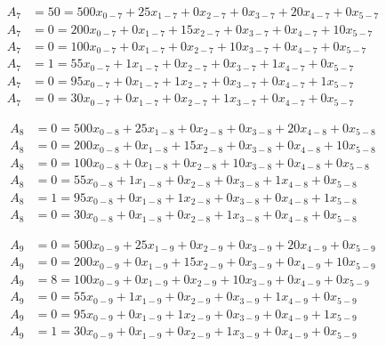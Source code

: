 \vspace{-\baselineskip}\begin{align*}
	A_{7} &= 50 = 500x_{0-7} + 25x_{1-7} + 0x_{2-7} + 0x_{3-7} + 20x_{4-7} + 0x_{5-7} \\ 
	A_{7} &= 0 = 200x_{0-7} + 0x_{1-7} + 15x_{2-7} + 0x_{3-7} + 0x_{4-7} + 10x_{5-7} \\ 
	A_{7} &= 0 = 100x_{0-7} + 0x_{1-7} + 0x_{2-7} + 10x_{3-7} + 0x_{4-7} + 0x_{5-7} \\ 
	A_{7} &= 1 = 55x_{0-7} + 1x_{1-7} + 0x_{2-7} + 0x_{3-7} + 1x_{4-7} + 0x_{5-7} \\ 
	A_{7} &= 0 = 95x_{0-7} + 0x_{1-7} + 1x_{2-7} + 0x_{3-7} + 0x_{4-7} + 1x_{5-7} \\ 
	A_{7} &= 0 = 30x_{0-7} + 0x_{1-7} + 0x_{2-7} + 1x_{3-7} + 0x_{4-7} + 0x_{5-7}
\end{align*}

\vspace{-\baselineskip}\begin{align*}
	A_{8} &= 0 = 500x_{0-8} + 25x_{1-8} + 0x_{2-8} + 0x_{3-8} + 20x_{4-8} + 0x_{5-8} \\ 
	A_{8} &= 0 = 200x_{0-8} + 0x_{1-8} + 15x_{2-8} + 0x_{3-8} + 0x_{4-8} + 10x_{5-8} \\ 
	A_{8} &= 0 = 100x_{0-8} + 0x_{1-8} + 0x_{2-8} + 10x_{3-8} + 0x_{4-8} + 0x_{5-8} \\ 
	A_{8} &= 0 = 55x_{0-8} + 1x_{1-8} + 0x_{2-8} + 0x_{3-8} + 1x_{4-8} + 0x_{5-8} \\ 
	A_{8} &= 1 = 95x_{0-8} + 0x_{1-8} + 1x_{2-8} + 0x_{3-8} + 0x_{4-8} + 1x_{5-8} \\ 
	A_{8} &= 0 = 30x_{0-8} + 0x_{1-8} + 0x_{2-8} + 1x_{3-8} + 0x_{4-8} + 0x_{5-8}
\end{align*}

\vspace{-\baselineskip}\begin{align*}
	A_{9} &= 0 = 500x_{0-9} + 25x_{1-9} + 0x_{2-9} + 0x_{3-9} + 20x_{4-9} + 0x_{5-9} \\ 
	A_{9} &= 0 = 200x_{0-9} + 0x_{1-9} + 15x_{2-9} + 0x_{3-9} + 0x_{4-9} + 10x_{5-9} \\ 
	A_{9} &= 8 = 100x_{0-9} + 0x_{1-9} + 0x_{2-9} + 10x_{3-9} + 0x_{4-9} + 0x_{5-9} \\ 
	A_{9} &= 0 = 55x_{0-9} + 1x_{1-9} + 0x_{2-9} + 0x_{3-9} + 1x_{4-9} + 0x_{5-9} \\ 
	A_{9} &= 0 = 95x_{0-9} + 0x_{1-9} + 1x_{2-9} + 0x_{3-9} + 0x_{4-9} + 1x_{5-9} \\ 
	A_{9} &= 1 = 30x_{0-9} + 0x_{1-9} + 0x_{2-9} + 1x_{3-9} + 0x_{4-9} + 0x_{5-9}
\end{align*}

